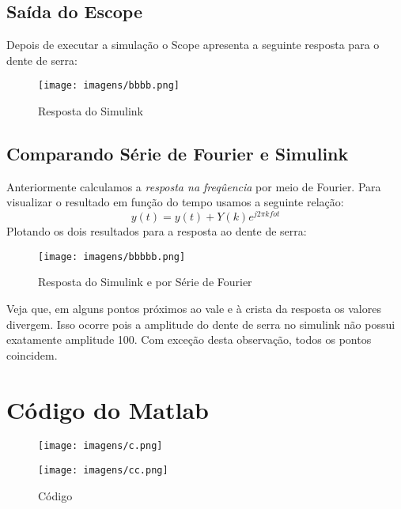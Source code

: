 \documentclass[a4paper, 12pt]{article}
\begin{document}
	\subsection{Saída do Escope}
	Depois de executar a simulação o Scope apresenta a seguinte resposta para o dente de serra:
	\begin{figure}[h]
		\center
		\texttt{[image: imagens/bbbb.png]}
		\caption{Resposta do Simulink}
	\end{figure}
	
	\subsection{Comparando Série de Fourier e Simulink}
	Anteriormente calculamos a \textit{resposta na freqûencia} por meio de Fourier. Para visualizar o resultado em função do tempo usamos a seguinte relação:
		\begin{equation}
			y(t) = y(t) + Y(k)e^{j2\pi k fo t}
		\end{equation}
	Plotando os dois resultados para a resposta ao dente de serra:\\
	\begin{figure}[h]
		\center
		\texttt{[image: imagens/bbbbb.png]}
		\caption{Resposta do Simulink e por Série de Fourier}
	\end{figure}
	\newpage
	Veja que, em alguns pontos próximos ao vale e à crista da resposta os valores divergem. Isso ocorre pois 
a amplitude do dente de serra no simulink não possui exatamente amplitude 100.
	Com exceção desta observação, todos os pontos coincidem.
	
\newpage
\section{Código do Matlab}
	\begin{figure}[h]
		\center
		\texttt{[image: imagens/c.png]}
	\end{figure}
	\begin{figure}[h]
		\center
		\texttt{[image: imagens/cc.png]}
		\caption{Código}
	\end{figure}
	
	
	
	
	
\end{document}
